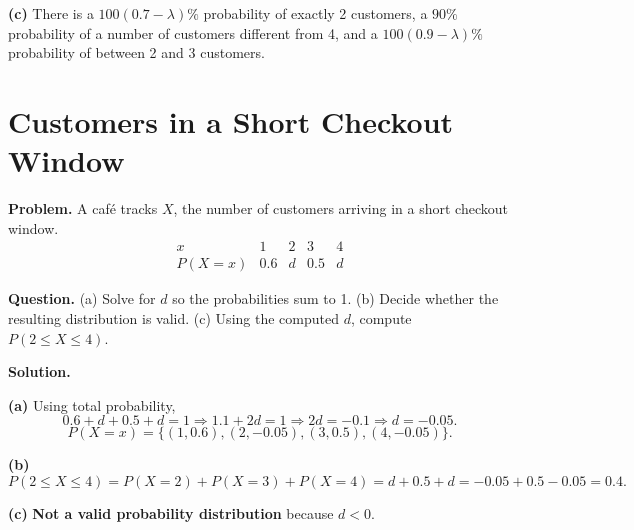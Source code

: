 		\textbf{(c)} There is a $100(0.7-\lambda)\%$ probability of exactly 2 customers, a $90\%$ probability of a number of customers different from 4, and a $100(0.9-\lambda)\%$ probability of between 2 and 3 customers.
		
		\section{Customers in a Short Checkout Window}
			\textbf{Problem.}
		A café tracks $X$, the number of customers arriving in a short checkout window.
		\[
		\begin{array}{c|cccc}
			x & 1 & 2 & 3 & 4\\
			\hline
			P(X=x) & 0.6 & d & 0.5 & d
		\end{array}
		\]
		
		\textbf{Question.}
		(a) Solve for $d$ so the probabilities sum to 1.
		(b) Decide whether the resulting distribution is valid.
		(c) Using the computed $d$, compute $P(2\le X\le 4)$.
		
		\textbf{Solution.}

		\textbf{(a)} Using total probability,
		\[
		0.6+d+0.5+d=1\Rightarrow 1.1+2d=1\Rightarrow 2d=-0.1\Rightarrow d=-0.05.
		\]
		\[
		P(X=x)=\{(1,0.6),(2,-0.05),(3,0.5),(4,-0.05)\}.
		\]
		\begin{center}
		\end{center}
		

		\textbf{(b)}
		\[
		P(2\le X\le 4)=P(X=2)+P(X=3)+P(X=4)=d+0.5+d=-0.05+0.5-0.05=0.4.
		\]
		\begin{center}
		\end{center}
		\textbf{(c)} \textbf{Not a valid probability distribution} because $d<0$.

